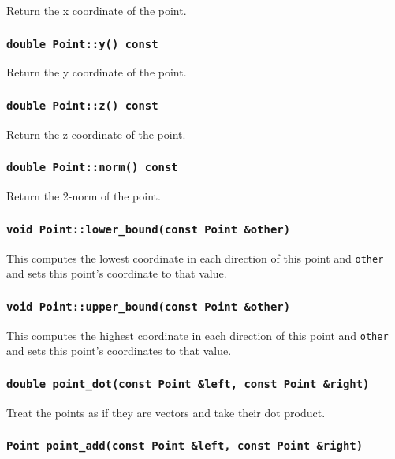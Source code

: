 Return the x coordinate of the point.

\subsubsection{\texttt{double Point::y() const}}

Return the y coordinate of the point.

\subsubsection{\texttt{double Point::z() const}}

Return the z coordinate of the point.

\subsubsection{\texttt{double Point::norm() const}}

Return the 2-norm of the point.

\subsubsection{\texttt{void Point::lower\_bound(const Point \&other)}}

This computes the lowest coordinate in each direction of this point and
\texttt{other} and sets this point's coordinate to that value.

\subsubsection{\texttt{void Point::upper\_bound(const Point \&other)}}

This computes the highest coordinate in each direction of this point and
\texttt{other} and sets this point's coordinates to that value.

\subsubsection{\texttt{double point\_dot(const Point \&left, const Point \&right)}}

Treat the points as if they are vectors and take their dot product.

\subsubsection{\texttt{Point point\_add(const Point \&left, const Point \&right)}}

